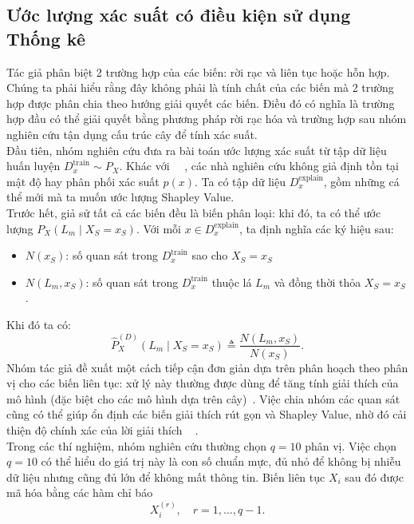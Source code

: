 \documentclass[12pt, a4paper]{article}
\theoremstyle{plain}
\theoremstyle{proposition}
\theoremstyle{lemma}
\begin{document}
\subsection{Ước lượng xác suất có điều kiện sử dụng Thống kê}
Tác giả phân biệt 2 trường hợp của các biến: rời rạc và liên tục hoặc hỗn hợp. Chúng ta phải hiểu rằng đây không phải là tính chất của các biến mà 2 trường hợp được phân chia theo hướng giải quyết các biến. Điều đó có nghĩa là trường hợp đầu có thể giải quyết bằng phương pháp rời rạc hóa và trường hợp sau nhóm nghiên cứu tận dụng cấu trúc cây để tính xác suất. \\
Đầu tiên, nhóm nghiên cứu đưa ra bài toán ước lượng xác suất từ tập dữ liệu huấn luyện $D_x^{\text{train}} \sim P_X$. 
Khác với ~\citep{aas2020explaining}~\citep{aas2021explaining}, các nhà nghiên cứu không giả định tồn tại mật độ hay phân phối xác suất $p(x)$. Ta có tập dữ liệu $D_x^{\text{explain}}$, gồm những cá thể mới mà ta muốn ước lượng Shapley Value. \\
Trước hết, giả sử tất cả các biến đều là biến phân loại: khi đó, ta có thể ước lượng 
\(
P_X(L_m \mid X_S = x_S).
\)
Với mỗi $x \in D_x^{\text{explain}}$, ta định nghĩa các ký hiệu sau:
\begin{itemize}
    \item $N(x_S)$: số quan sát trong $D_x^{\text{train}}$ sao cho $X_S = x_S$
    \item $N(L_m, x_S)$: số quan sát trong $D_x^{\text{train}}$ thuộc lá $L_m$ và đồng thời thỏa $X_S = x_S$.
\end{itemize}

Khi đó ta có:
\[
\hat{P}^{(D)}_X(L_m \mid X_S = x_S) \triangleq 
\frac{N(L_m, x_S)}{N(x_S)}. \tag{10}
\] 
Nhóm tác giả đề xuất một cách tiếp cận đơn giản dựa trên phân hoạch theo phân vị cho các biến liên tục: xử lý này thường được dùng để tăng tính giải thích 
của mô hình (đặc biệt cho các mô hình dựa trên cây)~\citep{benard2021mda}. 
Việc chia nhóm các quan sát cũng có thể giúp 
ổn định các biến giải thích rút gọn và Shapley Value, 
nhờ đó cải thiện độ chính xác của lời giải thích ~\citep{alvarez2018robustness}
.  \\
Trong các thí nghiệm, nhóm nghiên cứu thường chọn $q = 10$ phân vị. Việc chọn $q=10$ có thể hiểu do giá trị này là con số chuẩn mực, đủ nhỏ để không bị nhiễu dữ liệu nhưng cũng đủ lớn để không mất thông tin.
Biến liên tục $X_i$ sau đó được mã hóa bằng các hàm chỉ báo 
\[
X_i^{(r)}, \quad r = 1, \ldots, q-1.
\]  
\end{document}
